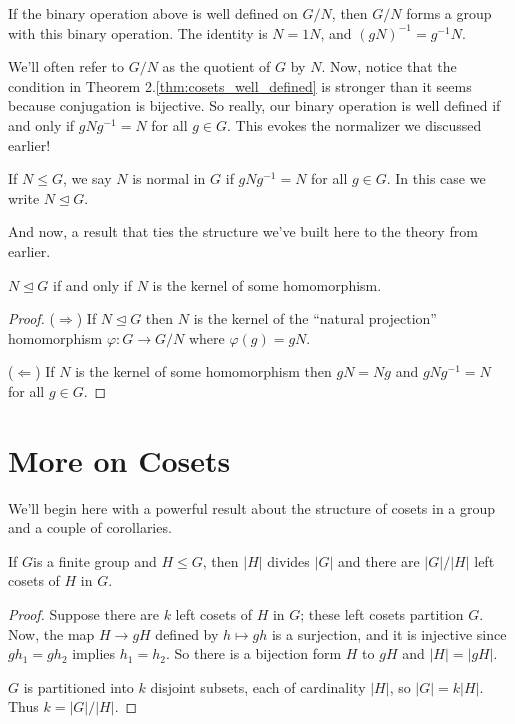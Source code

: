 \documentclass[../m171main.tex]{subfiles}
\begin{document}
\begin{theorem}[]
    If the binary operation above is well defined on $G / N$, then $G / N$ forms a group with this binary operation.
    The identity is $N = 1N$, and $(gN)^{-1} = g^{-1} N$.
\end{theorem}

We'll often refer to $G / N$ as the quotient of $G$ by $N$.
Now, notice that the condition in Theorem 2.\ref{thm:cosets_well_defined} is stronger than it seems because conjugation is bijective.
So really, our binary operation is well defined if and only if $gNg^{-1} = N$ for all $g \in G$.
This evokes the normalizer we discussed earlier!

\begin{definition}
    If $N \leq G$, we say $N$ is normal in $G$ if $gNg^{-1} = N$ for all $g \in G$.
    In this case we write $N \trianglelefteq G$.
\end{definition}

And now, a result that ties the structure we've built here to the theory from earlier.

\begin{theorem}[]   \label{thm:normal_kernel}
    $N \trianglelefteq G$ if and only if $N$ is the kernel of some homomorphism.
\end{theorem}

\begin{proof}
    ($\Rightarrow$)
    If $N \trianglelefteq G$ then $N$ is the kernel of the ``natural projection'' homomorphism $\varphi : G \to G / N$ where $\varphi(g) = gN$.
    \medskip

    ($\Leftarrow$)
    If $N$ is the kernel of some homomorphism then $gN = Ng$ and $gNg^{-1} = N$ for all $g \in G$.
\end{proof}

\section{More on Cosets}
We'll begin here with a powerful result about the structure of cosets in a group and a couple of corollaries.

\begin{theorem}
    If $G $is a finite group and $H \leq G$, then $|H|$ divides $|G|$ and there are $|G| / |H|$ left cosets of $H$ in $G$.
\end{theorem}

\begin{proof}
    Suppose there are $k$ left cosets of $H$ in $G$; these left cosets partition $G$.
    Now, the map $H \to gH$ defined by $h \mapsto gh$ is a surjection, and it is injective since $gh_1 = gh_2$ implies $h_1= h_2$.
    So there is a bijection form $H$ to $gH$ and $|H| = |gH|$.

    $G$ is partitioned into $k$ disjoint subsets, each of cardinality $|H|$, so $|G| = k|H|$.
    Thus $k = |G| / |H|$.
\end{proof}
\end{document}
